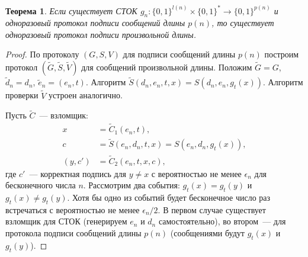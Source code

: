\documentclass[12pt,a4paper]{article}
\newcommand{\bits}{\{0,1\}}
\theoremstyle{definition}
\newtheorem{definition}{Определение}[section]
\theoremstyle{plain}
\newtheorem{theorem}{Теорема}[section]
\theoremstyle{remark}
\begin{document}
\begin{theorem}
Если существует СТОК $g_n: \bits^{l(n)}\times \bits^{*}\to \bits^{p(n)}$ и одноразовый протокол подписи сообщений длины
$p(n)$, то существует одноразовый протокол подписи произвольной длины.
\end{theorem}
\begin{proof}
По протоколу $(G,S,V)$ для подписи сообщений длины $p(n)$
построим протокол $(\tilde G,\tilde S,\tilde V)$ для
сообщений произвольной длины. Положим $\tilde G = G$, $\tilde d_n= d_n$, $\tilde e_n = (e_n, t)$. Алгоритм $\tilde S(d_n, e_n, t, x) = S(d_n, e_n, g_t(x))$. Алгоритм проверки $\tilde V$ устроен аналогично.

Пусть $\tilde C$~--- взломщик:
$$
\begin{aligned}
x &= \tilde C_1(e_n, t),\\
c &= \tilde S(e_n, d_n, t, x) = S(e_n, d_n, g_t(x)),\\
(y, c') &= \tilde C_2(e_n,t,x,c),
\end{aligned}
$$
где $c'$~--- корректная подпись для $y\neq x$ с вероятностью 
не менее $\epsilon_n$ для бесконечного числа $n$.
Рассмотрим два события: $g_t(x) = g_t(y)$ и $g_t(x) \neq g_t(y)$.
Хотя бы одно из событий будет бесконечное число раз встречаться
с вероятностью не менее $\epsilon_n/2$. В первом случае существует взломщик для СТОК (генерируем $e_n$ и $d_n$ самостоятельно), во втором~--- для протокола
подписи сообщений длины $p(n)$ (сообщениями будут $g_t(x)$ и $g_t(y)$).
 \end{proof}
 
%
\end{document}
